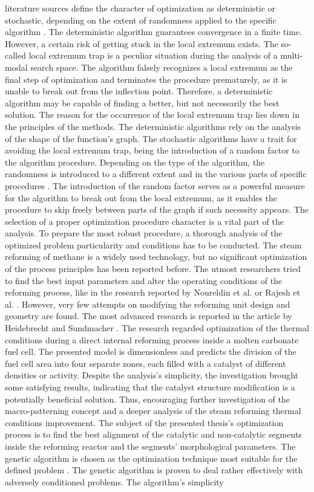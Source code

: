 literature sources define the character of optimization as deterministic or stochastic, depending on the extent of randomness applied to the specific algorithm \cite{Francisco2005}. The deterministic algorithm guarantees convergence in a finite time. However, a certain risk of getting stuck in the local extremum exists. The so-called local extremum trap is a peculiar situation during the analysis of a multi-modal search space. The algorithm falsely recognizes a local extremum as the final step of optimization and terminates the procedure prematurely, as it is unable to break out from the inflection point. Therefore, a deterministic algorithm may be capable of finding a better, but not necessarily the best solution. The reason for the occurrence of the local extremum trap lies down in the principles of the methods. The deterministic algorithms rely on the analysis of the shape of the function’s graph. The stochastic algorithms have a trait for avoiding the local extremum trap, being the introduction of a random factor to the algorithm procedure. Depending on the type of the algorithm, the randomness is introduced to a different extent and in the various parts of specific procedures \cite{Albrecht2003, Spall2012}. The introduction of the random factor serves as a powerful measure for the algorithm to break out from the local extremum, as it enables the procedure to skip freely between parts of the graph if such necessity appears. The selection of a proper optimization procedure character is a vital part of the analysis. To prepare the most robust procedure, a thorough analysis of the optimized problem particularity and conditions has to be conducted. The steam reforming of methane is a widely used technology, but no significant optimization of the process principles has been reported before. The utmost researchers tried to find the best input parameters and alter the operating conditions of the reforming process, like in the research reported by Noureldin et al. or Rajesh et al. \cite{Noureldin2014, Rajesh2000}. However, very few attempts on modifying the reforming unit design and geometry are found. The most advanced research is reported in the article by Heidebrecht and Sundmacher \cite{Heidebrecht2005}. The research regarded optimization of the thermal conditions during a direct internal reforming process inside a molten carbonate fuel cell. The presented model is dimensionless and predicts the division of the fuel cell area into four separate zones, each filled with a catalyst of different densities or activity. Despite the analysis's simplicity, the investigation brought some satisfying results, indicating that the catalyst structure modification is a potentially beneficial solution. Thus, encouraging further investigation of the macro-patterning concept and a deeper analysis of the steam reforming thermal conditions improvement. The subject of the presented thesis's optimization process is to find the best alignment of the catalytic and non-catalytic segments inside the reforming reactor and the segments' morphological parameters. The genetic algorithm is chosen as the optimization technique most suitable for the defined problem \cite{Fouskakis2002}. The genetic algorithm is proven to deal rather effectively with adversely conditioned problems. The algorithm's simplicity 